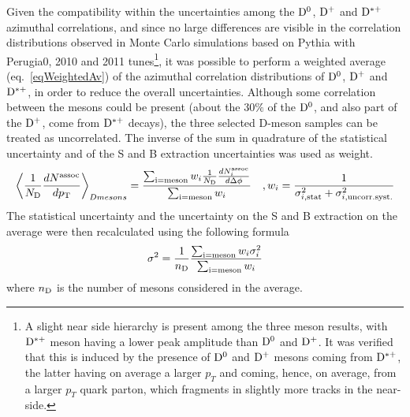 %
%
%
%
Given the compatibility within the uncertainties among the ${\rm D^0}$, ${\rm D^+}$ and ${\rm D^{*+}}$ azimuthal correlations, and since no large differences are visible in the correlation distributions observed in Monte Carlo simulations based on Pythia with Perugia0, 2010 and 2011 tunes\footnote{A slight near side hierarchy is present among the three meson results, with ${\rm D^{*+}}$ meson having a lower peak amplitude than ${\rm D^0}$ and ${\rm D^+}$. It was verified that this is induced by the presence of ${\rm D^0}$ and ${\rm D^+}$ mesons coming from ${\rm D^{*+}}$, the latter having on average a larger $p_T$ and coming, hence, on average, from a larger $p_T$ quark parton, which fragments in slightly more tracks in the near-side.},
it was possible to perform a weighted average (eq.~\ref{eqWeightedAv}) of the azimuthal correlation distributions of ${\rm D^0}$, ${\rm D^+}$ and ${\rm D^{*+}}$, in order to reduce the overall uncertainties.
Although some correlation between the mesons could be present (about the 30$\%$ of the ${\rm D^0}$, and also part of the ${\rm D^+}$, come from ${\rm D^{*+}}$ decays), the three selected D-meson samples can be treated as uncorrelated. The inverse of the sum in quadrature of the statistical uncertainty and of the S and B extraction uncertainties was used as weight. 
\begin{equation}
  \left \langle \frac{1}{N_{\rm D}}\frac{dN^{\rm assoc}}{dp_{\rm T}} \right \rangle_{D mesons} =  \frac{\sum_{\rm i=meson}w_{i}\frac{1}{N_{\rm D}}\frac{dN^{\rm assoc}_{i}}{d\Delta\phi}}{\sum_{\rm i=meson}w_{i}}\quad , w_{i}=\frac{1}{\sigma^{2}_{i, \rm stat}+\sigma^{2}_{i, \rm uncorr. syst.}}
\label{eqWeightedAv}
\end{equation}
The statistical uncertainty and the uncertainty on the S and B extraction on the average were then recalculated using the following formula
\begin{equation}
  \sigma^{2}=\frac{1}{n_{\rm D}}\frac{\sum_{\rm i=meson}w_{i}\sigma^{2}_{i}}{\sum_{\rm i=meson}w_{i}}
\end{equation}
where $n_{\rm D}$ is the number of mesons considered in the average.
